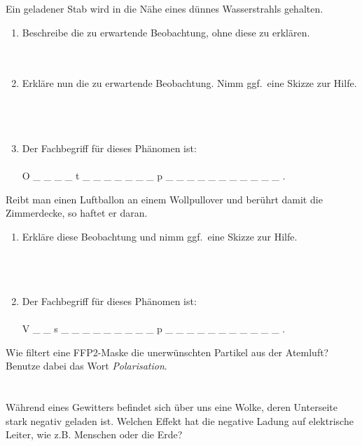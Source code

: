 \documentclass[task=1]{exercise}
\begin{document}
  Ein geladener Stab wird in die Nähe eines dünnes Wasserstrahls gehalten.
  \begin{enumerate}[label=\textnormal{\alph*)}]
    \item Beschreibe die zu erwartende Beobachtung, ohne diese zu erklären.\\~\\~\\
    \item Erkläre nun die zu erwartende Beobachtung. Nimm ggf.\ eine Skizze zur Hilfe.\\~\\~\\~\\
    \item Der Fachbegriff für dieses Phänomen ist:\\~\\
    O \_ \_ \_ \_ t \_ \_ \_ \_ \_ \_ \_ p \_ \_ \_ \_ \_ \_ \_ \_ \_ \_ \_ .
  \end{enumerate}  
  
  Reibt man einen Luftballon an einem Wollpullover und berührt damit die Zimmerdecke, so haftet er daran.
  \begin{enumerate}[label=\textnormal{\alph*)}]
    \item Erkläre diese Beobachtung und nimm ggf.\ eine Skizze zur Hilfe.\\~\\~\\~\\
    \item Der Fachbegriff für dieses Phänomen ist:\\~\\
    V \_ \_ s \_ \_ \_ \_ \_ \_ \_ \_ \_ p \_ \_ \_ \_ \_ \_ \_ \_ \_ \_ \_ .
  \end{enumerate} 
  
  Wie filtert eine FFP2-Maske die unerwünschten Partikel aus der Atemluft? Benutze dabei das Wort \emph{Polarisation}.\\~\\~\\
  
  Während eines Gewitters befindet sich über uns eine Wolke, deren Unterseite stark negativ geladen ist. Welchen Effekt hat die negative Ladung auf elektrische Leiter, wie z.B. Menschen oder die Erde?\\~\\~\\~\\~\\
  
\end{document}

